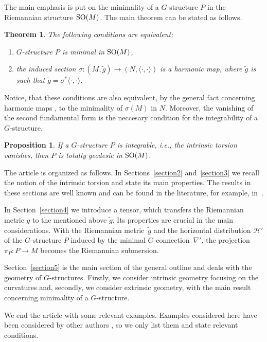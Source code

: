 \documentclass[pdftex]{sigma}
\numberwithin{equation}{section}
\newtheorem*{Theorem*}{Theorem}
\newtheorem*{Proposition*}{Proposition}
 { \theoremstyle{definition}
\newtheorem{Example}[Theorem]{Example}
\newtheorem{Remark}[Theorem]{Remark} }
\newcommand{\skal}[2]{\langle #1,#2\rangle}
\begin{document}
The main emphasis is put on the minimality of a $G$-structure $P$ in the Riemannian struc\-tu\-re~${\rm SO}(M)$. The main theorem can be stated as follows.
\begin{Theorem*}
The following conditions are equivalent:
\begin{enumerate}\itemsep=0pt
\item[$1)$] $G$-structure $P$ is minimal in ${\rm SO}(M)$,
\item[$2)$] the induced section $\sigma\colon (M,\tilde{g})\to (N,\skal{\cdot}{\cdot})$ is a harmonic map, where $\tilde{g}$ is such that $\tilde{g}=\sigma^{\ast}\skal{\cdot}{\cdot}$.
\end{enumerate}
\end{Theorem*}
Notice, that these conditions are also equivalent, by the general fact concerning harmonic maps \cite{el}, to the minimality of $\sigma(M)$ in $N$. Moreover, the vanishing of the second fundamental form is the neccesary condition for the integrability of a $G$-structure.
\begin{Proposition*}
If a $G$-structure $P$ is integrable, i.e., the intrinsic torsion vanishes, then $P$ is totally geodesic in ${\rm SO}(M)$.
\end{Proposition*}

The article is organized as follows. In Sections~\ref{section2} and~\ref{section3} we recall the notion of the intrinsic torsion and state its main properties. The results in these sections are well known and can be found in the literature, for example, in~\cite{gmc2,cw2}.

In Section~\ref{section4} we introduce a tensor, which transfers the Riemannian metric $g$ to the mentioned above $\tilde{g}$. Its properties are crucial in the main considerations. With the Riemannian metric~$\tilde{g}$ and the horizontal distribution $\mathcal{H}'$ of the $G$-structure $P$ induced by the minimal $G$-connec\-tion~$\nabla '$, the projection $\pi_P\colon P\to M$ becomes the Riemannian submersion.

Section~\ref{section5} is the main section of the general outline and deals with the geometry of $G$-structures. Firstly, we consider intrinsic geometry focusing on the curvatures and, secondly, we consider extrinsic geometry, with the main result concerning minimality of a $G$-structure.

We end the article with some relevant examples. Examples considered here have been considered by other authors \cite{ggv,gd,hl}, so we only list them and state relevant conditions.
\end{document}
